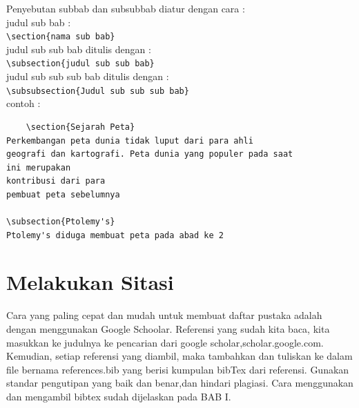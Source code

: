 Penyebutan subbab dan subsubbab diatur dengan cara : \\
    judul sub bab : \\ 
    \verb|\section{nama sub bab}| \\
    judul sub sub bab ditulis dengan :\\ 
    \verb|\subsection{judul sub sub bab} | \\
    judul sub sub sub bab ditulis dengan : \\ \verb|\subsubsection{Judul sub sub sub bab} | \\
    contoh :
    \begin{verbatim}
    \section{Sejarah Peta}
Perkembangan peta dunia tidak luput dari para ahli 
geografi dan kartografi. Peta dunia yang populer pada saat 
ini merupakan 
kontribusi dari para 
pembuat peta sebelumnya

\subsection{Ptolemy's}
Ptolemy's diduga membuat peta pada abad ke 2
\end{verbatim}


\section{Melakukan Sitasi}

Cara yang paling cepat dan mudah untuk membuat daftar pustaka adalah dengan menggunakan Google Schoolar. Referensi yang sudah kita baca, kita masukkan ke judulnya ke pencarian dari google scholar,scholar.google.com. Kemudian, setiap referensi yang diambil, maka tambahkan dan tuliskan ke dalam file bernama references.bib yang berisi kumpulan bibTex dari referensi. Gunakan standar pengutipan yang baik dan benar,dan hindari plagiasi. Cara menggunakan dan mengambil bibtex sudah dijelaskan pada BAB I. 

